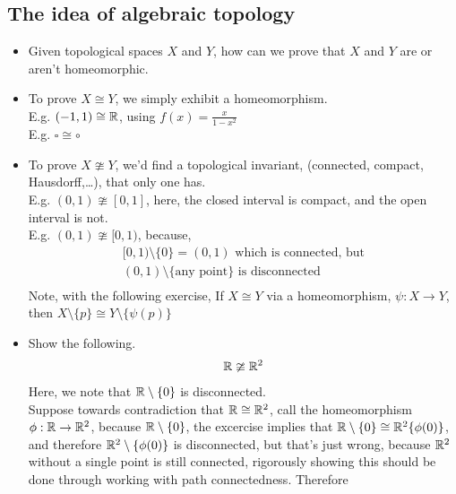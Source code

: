\documentclass[../notes.tex]{subfiles}
\begin{document}
\subsection{The idea of algebraic topology}
    \begin{itemize}
        \item Given topological spaces $X$ and $Y$, how can we prove that $X$ and $Y$ are or aren't homeomorphic.
        \item To prove $X\cong Y$, we simply exhibit a homeomorphism.\\
            E.g. $(-1,1) \cong \mathbb{R}$, using $f(x) = \frac{x}{1-x^2}$\\
            E.g. $\square \cong \circ$
        \item To prove $X\ncong Y$, we'd find a topological invariant, (connected, compact, Hausdorff,\ldots), that only one has.\\
            E.g. $(0,1) \ncong [0,1]$, here, the closed interval is compact, and the open interval is not.\\
            E.g. $(0,1) \ncong [0,1)$, because,\\
            \begin{align*}
                [0,1)\setminus \{0\} = (0,1) \text{ which is connected, but}\\
                (0,1)\setminus \{\text{any point}\} \text{ is disconnected}\\
            \end{align*}
            Note, with the following exercise, If $X\cong Y$ via a homeomorphism, $\psi : X\rightarrow Y$,
            then $X\setminus\{p\}\cong Y\setminus \{\psi(p)\}$
        \item Show the following. \\
            \begin{align*}
                \mathbb{R} \ncong \mathbb{R}^2\\
            \end{align*}
            Here, we note that $\mathbb{R} \setminus \{0\}$ is disconnected.\\
            Suppose towards contradiction that $\mathbb{R} \cong\mathbb{R}^2$, call the homeomorphism $\phi:\mathbb{R}\rightarrow \mathbb{R}^2$, because
            $\mathbb{R}\setminus \{0\}$, the excercise implies that $\mathbb{R}\setminus \{0\}\cong \mathbb{R}^2\{\phi(0)\}$, and therefore
            $\mathbb{R}^2\setminus\{\phi(0)\}$ is disconnected, but that's just wrong, because $\mathbb{R}^2$ without a single point
            is still connected, rigorously showing this should be done through working with path connectedness. Therefore

\end{itemize}
\end{document}
